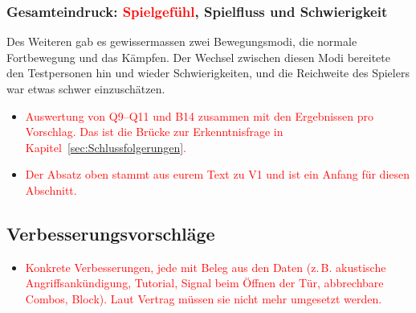 \documentclass[../Main.tex]{subfiles}
\begin{document}
\subsubsection{Gesamteindruck: \textcolor{red}{Spielgefühl}, Spielfluss und Schwierigkeit} \label{sec:Gesamteindruck}

Des Weiteren gab es gewissermassen zwei Bewegungsmodi, die normale Fortbewegung und das Kämpfen. Der Wechsel zwischen diesen Modi bereitete den Testpersonen hin und wieder Schwierigkeiten, und die Reichweite des Spielers war etwas schwer einzuschätzen.

\begin{itemize}[leftmargin=1.5cm]
    \item \textcolor{red}{Auswertung von Q9--Q11 und B14 zusammen mit den Ergebnissen pro Vorschlag. Das ist die Brücke zur Erkenntnisfrage in Kapitel~\ref{sec:Schlussfolgerungen}.}
    \item \textcolor{red}{Der Absatz oben stammt aus eurem Text zu V1 und ist ein Anfang für diesen Abschnitt.}
\end{itemize}

\subsection{Verbesserungsvorschläge} \label{sec:Verbesserungen}

\begin{itemize}[leftmargin=1.5cm]
    \item \textcolor{red}{Konkrete Verbesserungen, jede mit Beleg aus den Daten (z.\,B. akustische Angriffsankündigung, Tutorial, Signal beim Öffnen der Tür, abbrechbare Combos, Block). Laut Vertrag müssen sie nicht mehr umgesetzt werden.}
\end{itemize}
\end{document}
